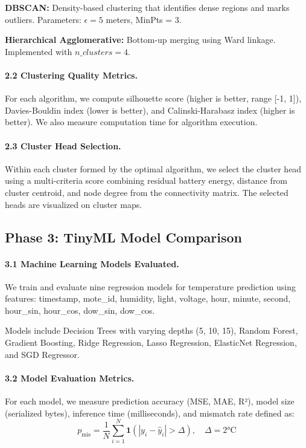 \documentclass[12pt,a4paper]{article}
\begin{document}
\textbf{DBSCAN:} Density-based clustering that identifies dense regions and marks outliers. Parameters: $\epsilon = 5$ meters, MinPts = 3.

\textbf{Hierarchical Agglomerative:} Bottom-up merging using Ward linkage. Implemented with $n\_clusters=4$.

\paragraph{2.2 Clustering Quality Metrics.}
For each algorithm, we compute silhouette score (higher is better, range [-1, 1]), Davies-Bouldin index (lower is better), and Calinski-Harabasz index (higher is better). We also measure computation time for algorithm execution.

\paragraph{2.3 Cluster Head Selection.}
Within each cluster formed by the optimal algorithm, we select the cluster head using a multi-criteria score combining residual battery energy, distance from cluster centroid, and node degree from the connectivity matrix. The selected heads are visualized on cluster maps.

\subsection{Phase 3: TinyML Model Comparison}

\paragraph{3.1 Machine Learning Models Evaluated.}
We train and evaluate nine regression models for temperature prediction using features: timestamp, mote\_id, humidity, light, voltage, hour, minute, second, hour\_sin, hour\_cos, dow\_sin, dow\_cos.

Models include Decision Trees with varying depths (5, 10, 15), Random Forest, Gradient Boosting, Ridge Regression, Lasso Regression, ElasticNet Regression, and SGD Regressor.

\paragraph{3.2 Model Evaluation Metrics.}
For each model, we measure prediction accuracy (MSE, MAE, R²), model size (serialized bytes), inference time (milliseconds), and mismatch rate defined as:
\[
  p_{\text{mis}} = \frac{1}{N}\sum_{i=1}^N \mathbf{1}(|y_i - \hat{y}_i| > \Delta), \quad \Delta = 2°\text{C}
\]
\end{document}
